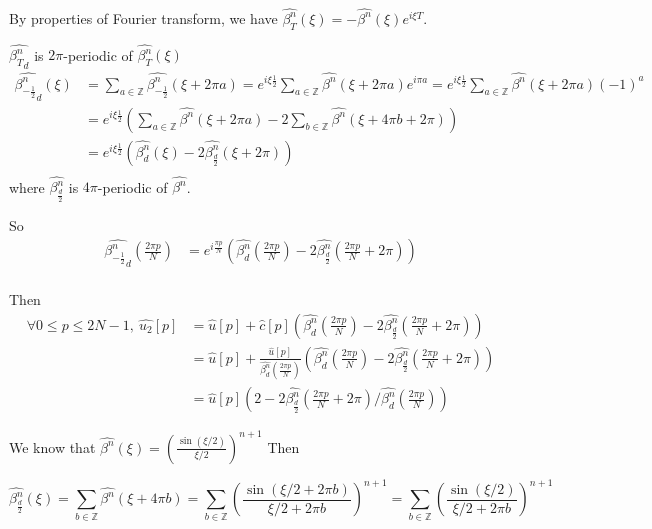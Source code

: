 \documentclass{article}
\begin{document}
	By properties of Fourier transform, we have $\hat{\beta^n_T}(\xi) =-\hat{\beta^n}(\xi)e^{i\xi T}$.
	
	$\widehat{{\beta^n_T}_d}$ is $2\pi$-periodic of $\hat{\beta^n_T}(\xi)$
	\begin{equation*}
	\begin{split}
	\widehat{{\beta^n_{-\frac{1}{2}}}_d}(\xi) &=\sum_{a\in\mathbb{Z}} \hat{\beta^n_{-\frac{1}{2}}}(\xi+2\pi a) = e^{i\xi \frac{1}{2}} \sum_{a\in\mathbb{Z}}  \hat{\beta^n}(\xi+2\pi a)  e^{i \pi a}= e^{i\xi \frac{1}{2}} \sum_{a\in\mathbb{Z}}  \hat{\beta^n}(\xi+2\pi a)  (-1)^a\\
	&=e^{i\xi \frac{1}{2}} (\sum_{a\in\mathbb{Z}}  \hat{\beta^n}(\xi+2\pi a) - 2 \sum_{b\in\mathbb{Z}}  \hat{\beta^n}(\xi+4\pi b+2\pi))\\
	&=e^{i\xi \frac{1}{2}} (\hat{\beta^n_d}(\xi) - 2 \hat{\beta^n_{\frac{d}{2}}}(\xi + 2\pi))\\
	\end{split}
	\end{equation*}
	where $\hat{\beta^n_{\frac{d}{2}}}$ is $4\pi$-periodic of $\hat{\beta^n}$.
	
	So
	\begin{equation*}
	\begin{split}
	\widehat{{\beta^n_{-\frac{1}{2}}}_d}(\frac{2\pi p}{N}) &=e^{i\frac{\pi p}{N}} (\hat{\beta^n_d}(\frac{2\pi p}{N}) - 2 \hat{\beta^n_{\frac{d}{2}}}(\frac{2\pi p}{N} + 2\pi))\\
	\end{split}
	\end{equation*}
	
	Then
	\begin{equation*}
	\begin{split}
	\forall 0\leq p\leq 2N-1,\ \hat{u_2}[p]&=\hat{u}[p] + \hat{c}[p] (\hat{\beta^n_d}(\frac{2\pi p}{N}) - 2 \hat{\beta^n_{\frac{d}{2}}}(\frac{2\pi p}{N} + 2\pi))  \\
	&=\hat{u}[p] + \frac{\hat{u}[p]}{\hat{\beta^n_d}(\frac{2\pi p}{N})}  (\hat{\beta^n_d}(\frac{2\pi p}{N}) - 2 \hat{\beta^n_{\frac{d}{2}}}(\frac{2\pi p}{N} + 2\pi))  \\
	&= \hat{u}[p] (2- 2 \hat{\beta^n_{\frac{d}{2}}}(\frac{2\pi p}{N} + 2\pi)/\hat{\beta^n_d}(\frac{2\pi p}{N}))
	\end{split}
	\end{equation*}
	
	We know that $\hat{\beta^n}(\xi) = (\frac{\sin (\xi/2)}{\xi/2})^{n+1}$
	Then
	
	\begin{equation*}
	\hat{\beta^n_{\frac{d}{2}}}(\xi) = \sum_{b\in\mathbb{Z}}  \hat{\beta^n}(\xi+4\pi b) = \sum_{b\in\mathbb{Z}}  (\frac{\sin (\xi/2 +2\pi b)}{\xi/2 +2\pi b})^{n+1}= \sum_{b\in\mathbb{Z}}  (\frac{\sin (\xi/2)}{\xi/2 +2\pi b})^{n+1}
	\end{equation*}
	
\end{document}
